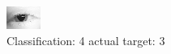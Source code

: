 \begin{figure}[h!]
\begin{center}
\includegraphics[width=0.60\columnwidth]{figures/ID123_class_4_target_3.png}
\end{center}
\caption{ Classification: 4 actual target: 3}
\label{fig:ID123_class_4_target_3}
\end{figure}
